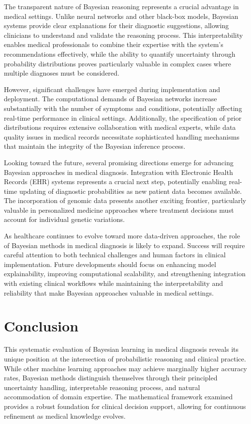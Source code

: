 \documentclass[3p,times,procedia]{elsarticle}
\begin{document}
The transparent nature of Bayesian reasoning represents a crucial advantage in medical settings. Unlike neural networks and other black-box models, Bayesian systems provide clear explanations for their diagnostic suggestions, allowing clinicians to understand and validate the reasoning process. This interpretability enables medical professionals to combine their expertise with the system's recommendations effectively, while the ability to quantify uncertainty through probability distributions proves particularly valuable in complex cases where multiple diagnoses must be considered.

However, significant challenges have emerged during implementation and deployment. The computational demands of Bayesian networks increase substantially with the number of symptoms and conditions, potentially affecting real-time performance in clinical settings. Additionally, the specification of prior distributions requires extensive collaboration with medical experts, while data quality issues in medical records necessitate sophisticated handling mechanisms that maintain the integrity of the Bayesian inference process.

Looking toward the future, several promising directions emerge for advancing Bayesian approaches in medical diagnosis. Integration with Electronic Health Records (EHR) systems represents a crucial next step, potentially enabling real-time updating of diagnostic probabilities as new patient data becomes available. The incorporation of genomic data presents another exciting frontier, particularly valuable in personalized medicine approaches where treatment decisions must account for individual genetic variations.

As healthcare continues to evolve toward more data-driven approaches, the role of Bayesian methods in medical diagnosis is likely to expand. Success will require careful attention to both technical challenges and human factors in clinical implementation. Future developments should focus on enhancing model explainability, improving computational scalability, and strengthening integration with existing clinical workflows while maintaining the interpretability and reliability that make Bayesian approaches valuable in medical settings.

\section{Conclusion}

This systematic evaluation of Bayesian learning in medical diagnosis reveals its unique position at the intersection of probabilistic reasoning and clinical practice. While other machine learning approaches may achieve marginally higher accuracy rates, Bayesian methods distinguish themselves through their principled uncertainty handling, interpretable reasoning process, and natural accommodation of domain expertise. The mathematical framework examined provides a robust foundation for clinical decision support, allowing for continuous refinement as medical knowledge evolves.
\end{document}

